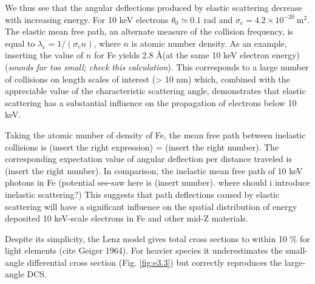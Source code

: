\documentclass [11pt, proquest, article] {uwthesis}[2016/11/22]
\begin{document}
We thus see that the angular deflections produced by elastic scattering decrease with increasing energy. For 10 keV electrons $\theta_0 \simeq 0.1$ rad and $\sigma_e = 4.2 \times 10^{-20}~\mathrm{m}^2$. The elastic mean free path, an alternate measure of the collision frequency, is equal to $\lambda_e = 1/(\sigma_e n)$, where $n$ is atomic number density. As an example, inserting the value of $n$ for Fe yields 2.8 \AA (at the same 10 keV electron energy) (\emph{sounds far too small; check this calculation}). This corresponds to a large number of collisions on length scales of interest (> 10 nm) which, combined with the appreciable value of the characteristic scattering angle, demonstrates that elastic scattering has a substantial influence on the propagation of electrons below 10 keV. 

Taking the atomic number of density of Fe, the mean free path between inelastic collisions is (insert the right expression) = (insert the right number). The corresponding expectation value of angular deflection per distance traveled is (insert the right number). In comparison, the inelastic mean free path of 10 keV photons in Fe (potential see-saw here is (insert number). where should i introduce inelastic scattering?) This suggests that path deflections caused by elastic scattering will have a significant influence on the spatial distribution of energy deposited 10 keV-scale electrons in Fe and other mid-Z materials. 

Despite its simplicity, the Lenz model gives total cross sections to within 10 \% for light elements (cite Geiger 1964). For heavier species it underestimates the small-angle differential cross section (Fig. \ref{fig:e3.3}) but correctly reproduces the large-angle DCS.
\end{document}
